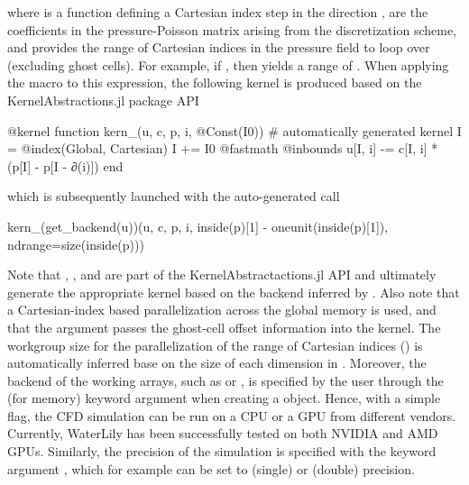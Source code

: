 \documentclass[10pt,a4paper]{article}
\begin{document}
where  is a function defining a Cartesian index step in the direction ,  are the coefficients in the pressure-Poisson matrix arising from the discretization scheme, and  provides the range of Cartesian indices  in the pressure field to loop over (excluding ghost cells). For example, if , then  yields a range of . When applying the  macro to this expression, the following kernel is produced based on the KernelAbstractions.jl package API \citep{Churavy2023}

\begin{minipage}{\linewidth}
\begin{jllisting}
@kernel function kern_(u, c, p, i, @Const(I0)) # automatically generated kernel
    I = @index(Global, Cartesian)
    I += I0
    @fastmath @inbounds u[I, i] -= c[I, i] * (p[I] - p[I - ∂(i)])
end
\end{jllisting}
\end{minipage}

which is subsequently launched with the auto-generated call

\begin{minipage}{\linewidth}
\begin{jllisting}
kern_(get_backend(u))(u, c, p, i, inside(p)[1] - oneunit(inside(p)[1]), ndrange=size(inside(p)))
\end{jllisting}
\end{minipage}

Note that , ,  and  are part of the KernelAbstractactions.jl API and ultimately generate the appropriate kernel based on the backend inferred by . Also note that a Cartesian-index based parallelization across the global memory is used, and that the  argument passes the ghost-cell offset information into the kernel. The workgroup size for the parallelization of the range of Cartesian indices () is automatically inferred base on the size of each dimension in . Moreover, the backend of the working arrays, such as  or , is specified by the user through the  (for memory) keyword argument when creating a  object. Hence, with a simple flag, the CFD simulation can be run on a CPU or a GPU from different vendors. Currently, WaterLily has been successfully tested on both NVIDIA and AMD GPUs. Similarly, the precision of the simulation is specified with the keyword argument , which for example can be set to  (single) or  (double) precision.
\end{document}
